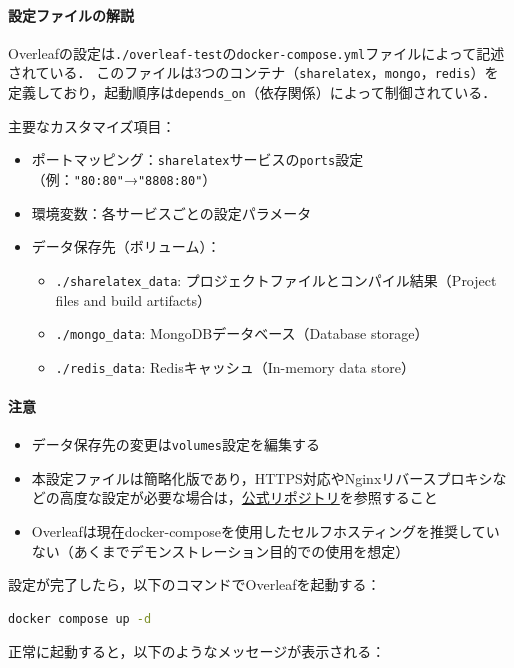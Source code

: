 \paragraph{設定ファイルの解説}
Overleafの設定は\texttt{./overleaf-test}の\texttt{docker-compose.yml}ファイルによって記述されている．
このファイルは3つのコンテナ（\texttt{sharelatex}，\texttt{mongo}，\texttt{redis}）を定義しており，起動順序は\texttt{depends\_on}（依存関係）によって制御されている．

主要なカスタマイズ項目：
\begin{itemize}
\item ポートマッピング：\texttt{sharelatex}サービスの\texttt{ports}設定（例：\texttt{"80:80"}→\texttt{"8808:80"}）
\item 環境変数：各サービスごとの設定パラメータ
\item データ保存先（ボリューム）：
  \begin{itemize}
  \item \texttt{./sharelatex\_data}: プロジェクトファイルとコンパイル結果（Project files and build artifacts）
  \item \texttt{./mongo\_data}: MongoDBデータベース（Database storage）
  \item \texttt{./redis\_data}: Redisキャッシュ（In-memory data store）
  \end{itemize}
\end{itemize}

\paragraph{注意}
\begin{itemize}
\item データ保存先の変更は\texttt{volumes}設定を編集する
\item 本設定ファイルは簡略化版であり，HTTPS対応やNginxリバースプロキシなどの高度な設定が必要な場合は，\href{https://github.com/overleaf/overleaf/tree/main}{公式リポジトリ}を参照すること
\item Overleafは現在docker-composeを使用したセルフホスティングを推奨していない（あくまでデモンストレーション目的での使用を想定）
\end{itemize}

設定が完了したら，以下のコマンドでOverleafを起動する：

\begin{lstlisting}[language=bash]
docker compose up -d
\end{lstlisting}

正常に起動すると，以下のようなメッセージが表示される：

